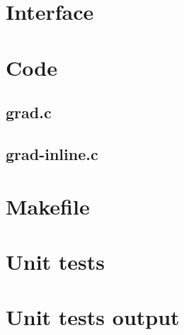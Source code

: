 \section{Interface}

\begin{scriptsize}
\begin{ttfamily}

\end{ttfamily}
\end{scriptsize}

\section{Code}

\subsection{grad.c}

\begin{scriptsize}
\begin{ttfamily}

\end{ttfamily}
\end{scriptsize}

\subsection{grad-inline.c}

\begin{scriptsize}
\begin{ttfamily}

\end{ttfamily}
\end{scriptsize}

\section{Makefile}

\begin{scriptsize}
\begin{ttfamily}

\end{ttfamily}
\end{scriptsize}

\section{Unit tests}

\begin{scriptsize}
\begin{ttfamily}

\end{ttfamily}
\end{scriptsize}

\section{Unit tests output}

\begin{scriptsize}
\begin{ttfamily}

\end{ttfamily}
\end{scriptsize}



